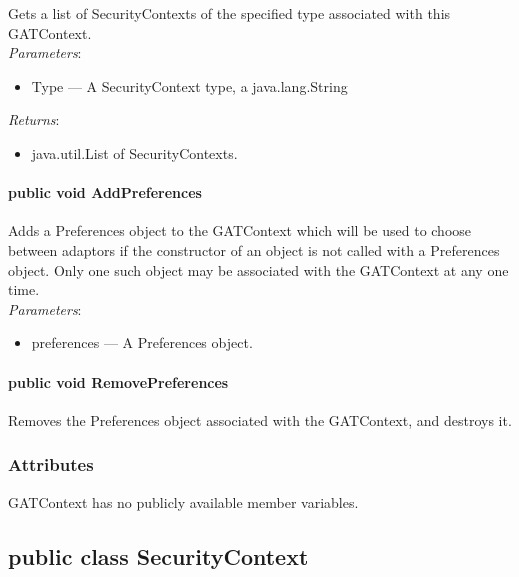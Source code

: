\documentclass[$Date: 2003/06/26 19:29:31 $]{glabarticle}
\begin{document}
Gets a list of SecurityContexts of the specified type associated with this GATContext.\\

\textit{Parameters}:
\begin{itemize}
\item[] Type --- A SecurityContext type, a java.lang.String
\end{itemize}

\textit{Returns}:
\begin{itemize}
\item[] java.util.List of SecurityContexts.
\end{itemize}

\paragraph{public void AddPreferences}

Adds a Preferences object to the GATContext which will be used to
choose between adaptors if the constructor of an object is not called
with a Preferences object.  Only one such object may be associated
with the GATContext at any one time.\\

\textit{Parameters}:
\begin{itemize}
\item[] preferences --- A Preferences object.
\end{itemize}

\paragraph{public void RemovePreferences}

Removes the  Preferences object associated with the GATContext, and
destroys it.


\subsubsection{Attributes}

GATContext has no publicly available member variables. 


\newpage

\subsection{public class SecurityContext}
\end{document}
